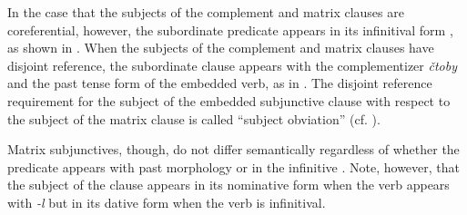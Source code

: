 \documentclass[output=paper,
modfonts,
newtxmath,
hidelinks,
]{langscibook}
\begin{document}
\noindent In the case that the subjects of the complement and matrix clauses are coreferential, however, the subordinate predicate appears in its infinitival form \citep[160, 236]{Cubberley2002}, as shown in . When the subjects of the complement and matrix clauses have disjoint reference, the subordinate clause appears with the complementizer \textit{čtoby} and the past tense form of the embedded verb, as in . The disjoint reference requirement for the subject of the embedded subjunctive clause with respect to the subject of the matrix clause is called “subject obviation” (cf. \citealt[1]{Antonenko2010}).

\ea \label{ex16}
	\z
\z

\ea \label{ex17}
	\z
\z

\noindent Matrix subjunctives, though, do not differ semantically regardless of whether the predicate appears with past morphology or in the infinitive \citep[10]{Asarina2006}. Note, however, that the subject of the clause appears in its nominative form when the verb appears with \textit{{}-l} but in its dative form when the verb is infinitival.
\end{document}
